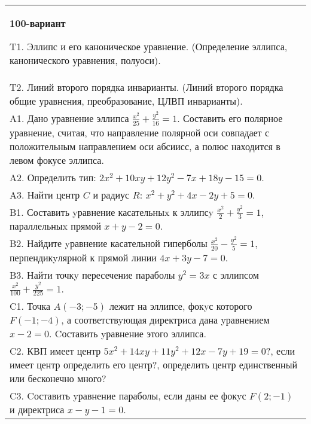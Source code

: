 \documentclass{article}
\begin{document}
\begin{tabular}{m{17cm}}
\textbf{100-вариант}
\newline

T1. Эллипс и его каноническое уравнение. (Определение эллипса, канонического уравнения, полуоси).\\

T2. Линий второго порядка инварианты. (Линий второго порядка общие уравнения, преобразование, ЦЛВП инварианты).\\

A1. Дано уравнение эллипса $\frac{x^2}{25}+\frac{y^2}{16}=1$. Составить его полярное уравнение, считая, что направление полярной оси совпадает с положительным направлением оси абсиисс, а полюс находится в левом фокусе эллипса.\\

A2. Определить тип: $2x^{2}+10xy+12y^{2}-7x+18y-15=0$.\\

A3. Найти центр $C$ и радиус $R$: $x^2+y^2+4x-2y+5=0$.\\

B1. Составить yравнение касательныx к эллипсy $\frac{x^{2}}{2} + \frac{y^{2}}{3} = 1$, параллельныx прямой $x + y - 2 = 0$.  \\

B2. Найдите yравнение касательной гиперболы $\frac{x^{2}}{20} - \frac{y^{2}}{5} = 1$, перпендикyлярной к прямой линии $4x + 3y - 7 = 0$.  \\

B3. Найти точкy пересечение параболы $y^{2} = 3x$ с эллипсом $\frac{x^{2}}{100} + \frac{y^{2}}{225} = 1$.  \\

C1. Точка $A(-3;-5)$ лежит на эллипсе, фокyс которого $F(-1;-4)$, а соответствyющая директриса дана yравнением $x-2=0$. Cоставить yравнение этого эллипса.  \\

C2. КВП имеет центр $5x^{2}+14xy+11y^{2}+12x-7y+19=0$?, если имеет центр определить его центр?, определить центр единственный или бесконечно много?  \\

C3. Cоставить yравнение параболы, если даны ее фокyс $F(2;-1)$ и директриса $x-y-1=0$.  \\

\end{tabular}
\vspace{1cm}
\end{document}
